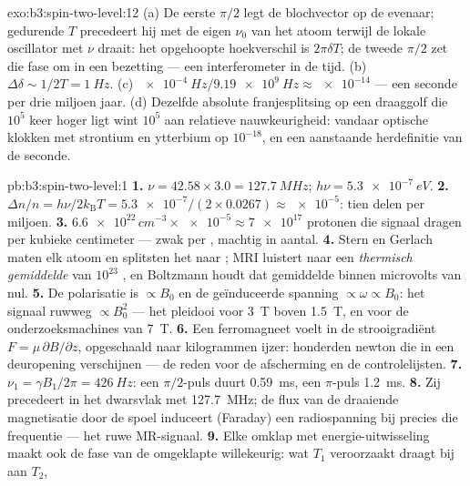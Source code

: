\begin{solution}{exo:b3:spin-two-level:12}
(a) De eerste $\pi/2$ legt de blochvector op de evenaar; gedurende $T$
precedeert hij met de eigen $\nu_0$ van het atoom terwijl de lokale
oscillator met $\nu$ draait: het opgehoopte hoekverschil is $2\pi\delta T$; de tweede $\pi/2$ zet die fase om in een bezetting --- een
interferometer in de tijd. (b) $\Delta\delta \sim
1/2T = \qty{1}{Hz}$.
(c) $\qty{e-4}{Hz}/\qty{9.19e9}{Hz} \approx
\num{e-14}$ --- een seconde
per drie miljoen jaar. (d) Dezelfde absolute franjesplitsing op een
draaggolf die $10^5$ keer hoger ligt wint $10^5$ aan relatieve
nauwkeurigheid: vandaar optische klokken met strontium en ytterbium op
$10^{-18}$, en een aanstaande herdefinitie van de seconde.
\end{solution}

\begin{solution}{pb:b3:spin-two-level:1}
\textbf{1.} $\nu = 42.58 \times 3.0 = \qty{127.7}{MHz}$; $h\nu =
\qty{5.3e-7}{eV}$.
\textbf{2.} $\Delta n/n = h\nu/2k_{\text{B}}T = \num{5.3e-7}/(2
\times 0.0267) \approx \num{e-5}$: tien delen per miljoen.
\textbf{3.} $\num{6.6e22}\,\unit{cm^{-3}} \times \num{e-5} \approx
\num{7e17}$ protonen die signaal dragen per kubieke centimeter --- zwak
per , machtig in aantal.
\textbf{4.} Stern en Gerlach maten elk atoom en splitsten het naar
; MRI luistert naar een \emph{thermisch gemiddelde} van
$10^{23}$ , en Boltzmann houdt dat gemiddelde binnen microvolts van
nul.
\textbf{5.} De polarisatie is $\propto B_0$ en de geïnduceerde spanning
$\propto \omega \propto B_0$: het signaal ruwweg $\propto B_0^2$ --- het
pleidooi voor \qty{3}{T} boven \qty{1.5}{T}, en voor de
onderzoeksmachines van \qty{7}{T}.
\textbf{6.} Een ferromagneet voelt in de strooigradiënt
$F = \mu\,\partial B/\partial z$, opgeschaald naar kilogrammen ijzer:
honderden newton die in een deuropening verschijnen --- de reden voor de
afscherming en de controlelijsten.
\textbf{7.} $\nu_1 = \gamma B_1/2\pi = \qty{426}{Hz}$: een $\pi/2$-puls
duurt \qty{0.59}{ms}, een $\pi$-puls \qty{1.2}{ms}.
\textbf{8.} Zij precedeert in het dwarsvlak met \qty{127.7}{MHz}; de flux
van de draaiende magnetisatie door de spoel induceert (Faraday) een
radiospanning bij precies die frequentie --- het ruwe MR-signaal.
\textbf{9.} Elke omklap met energie-uitwisseling maakt ook de fase van de
omgeklapte  willekeurig: wat $T_1$ veroorzaakt draagt bij aan $T_2$,

\end{solution}
